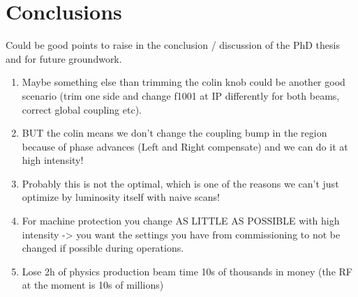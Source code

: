 \chapter{Conclusions}

\label{Conclusion} %


Could be good points to raise in the conclusion / discussion of the PhD thesis and for future groundwork.

\begin{enumerate}
    \item Maybe something else than trimming the colin knob could be another good scenario (trim one side and change f1001 at IP differently for both beams, correct global coupling etc).
    \item BUT the colin means we don't change the coupling bump in the region because of phase advances (Left and Right compensate) and we can do it at high intensity!
    \item Probably this is not the optimal, which is one of the reasons we can't just optimize by luminosity itself with naive scans!
    \item For machine protection you change AS LITTLE AS POSSIBLE with high intensity -> you want the settings you have from commissioning to not be changed if possible during operations.
    \item Lose 2h of physics production beam time 10s of thousands in money (the RF at the moment is 10s of millions)
\end{enumerate}


